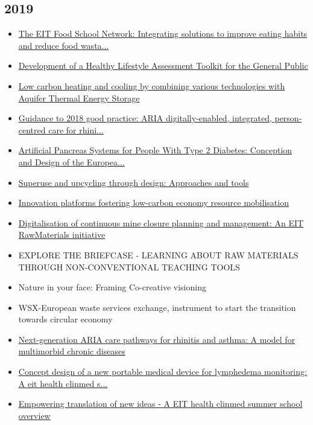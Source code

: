 \subsection*{2019}
\begin{itemize}[leftmargin=*, itemsep=0em, label=\textbullet]
\small
\item \href{https://doi.org/10.1111/nbu.12406}{The EIT Food School Network: Integrating solutions to improve eating habits and reduce food wasta...}
\item \href{https://doi.org/10.3389/fmed.2019.00134}{Development of a Healthy Lifestyle Assessment Toolkit for the General Public}
\item \href{https://doi.org/10.1016/j.scitotenv.2019.01.135}{Low carbon heating and cooling by combining various technologies with Aquifer Thermal Energy Storage}
\item \href{https://doi.org/10.1186/s13601-019-0252-0}{Guidance to 2018 good practice: ARIA digitally-enabled, integrated, person-centred care for rhini...}
\item \href{https://doi.org/10.1177/1932296818803588}{Artificial Pancreas Systems for People With Type 2 Diabetes: Conception and Design of the Europea...}
\item \href{https://doi.org/10.1088/1755-1315/225/1/012014}{Superuse and upcycling through design: Approaches and tools}
\item \href{https://doi.org/10.1108/WJSTSD-04-2018-0032}{Innovation platforms fostering low-carbon economy resource mobilisation}
\item \href{https://doi.org/10.36487/ACG_rep/1915_81_Kauppila}{Digitalisation of continuous mine closure planning and management: An EIT RawMaterials initiative}
\item EXPLORE THE BRIEFCASE - LEARNING ABOUT RAW MATERIALS THROUGH NON-CONVENTIONAL TEACHING TOOLS
\item Nature in your face: Framing Co-creative visioning
\item WSX-European waste services exchange, instrument to start the transition towards circular economy
\item \href{https://doi.org/10.1186/s13601-019-0279-2}{Next-generation ARIA care pathways for rhinitis and asthma: A model for multimorbid chronic diseases}
\item \href{https://doi.org/10.5220/0007696706110620}{Concept design of a new portable medical device for lymphedema monitoring: A eit health clinmed s...}
\item \href{https://doi.org/10.5220/0007696606030610}{Empowering translation of new ideas - A EIT health clinmed summer school overview}
\end{itemize}

